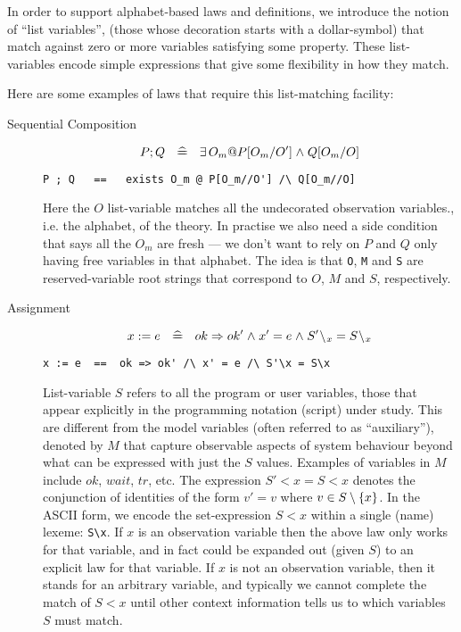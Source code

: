 In order to support alphabet-based laws and definitions,
we introduce the notion of ``list variables'',
(those whose decoration starts with a dollar-symbol)
that match against zero or more variables satisfying some property.
These list-variables encode simple expressions that give
some flexibility in how they match.



Here are some examples of laws that require this list-matching facility:
\begin{description}
%
\item[Sequential Composition]
$$
  P ; Q ~\defs~ \exists O_m @ P[O_m/O'] \land Q[O_m/O]
$$
\begin{verbatim}
P ; Q   ==   exists O_m @ P[O_m//O'] /\ Q[O_m//O]
\end{verbatim}
Here the $O$ list-variable matches all the undecorated
observation variables., i.e. the alphabet, of the theory.
In practise we also need a side condition that says all the $O_m$
are fresh --- we don't want to rely on $P$ and $Q$ only having free variables
in that alphabet.
The idea is that \texttt{O}, \texttt{M} and \texttt{S} are reserved-variable root strings that
correspond to $O$, $M$ and $S$, respectively.
%
\item[Assignment]
$$
  x := e ~\defs~ ok \implies ok' \land x' = e
    \land S'\less x = S\less x
$$
\begin{verbatim}
x := e  ==  ok => ok' /\ x' = e /\ S'\x = S\x
\end{verbatim}
List-variable $S$ refers to all the program or user variables,
those that appear explicitly in the programming notation (script) under study.
This are different from the model variables (often referred to as
``auxiliary''), denoted by $M$ that capture observable aspects
of system behaviour beyond what can be expressed with just the $S$
values. Examples of variables in $M$ include $ok$, $wait$, $tr$, etc.
The expression $S'\less x = S\less x$
denotes the conjunction of identities of the form $v'=v$
where $v \in S\setminus\{x\}$.
In the ASCII form, we encode the set-expression $S\less x$
within a single (name) lexeme: \verb"S\x".
If $x$ is an observation variable
then the above law only works for that variable,
and in fact could be expanded out (given $S$)
to an explicit law for that variable.
If $x$ is not an observation variable,
then it stands for an arbitrary variable,
and typically we cannot complete the match of $S\less x$
until
other context information tells us to which variables $S$ must match.
\par

\end{description}
